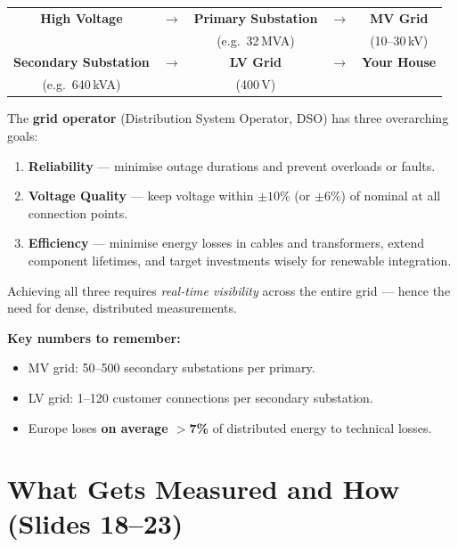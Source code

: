 \begin{center}
\begin{tabular}{ccccc}
\toprule
\textbf{High Voltage} & $\rightarrow$ &
\textbf{Primary Substation} & $\rightarrow$ &
\textbf{MV Grid} \\
& & (e.g.\ 32\,MVA) & & (10--30\,kV) \\
\midrule
\textbf{Secondary Substation} & $\rightarrow$ &
\textbf{LV Grid} & $\rightarrow$ &
\textbf{Your House} \\
(e.g.\ 640\,kVA) & & (400\,V) & & \\
\bottomrule
\end{tabular}
\end{center}
 
\vspace{0.5em}
The \textbf{grid operator} (Distribution System Operator, DSO) has
three overarching goals:
 
\begin{enumerate}[leftmargin=2em, itemsep=4pt]
  \item \textbf{Reliability} --- minimise outage durations and
        prevent overloads or faults.
  \item \textbf{Voltage Quality} --- keep voltage within
        $\pm10\%$ (or $\pm6\%$) of nominal at all connection points.
  \item \textbf{Efficiency} --- minimise energy losses in cables
        and transformers, extend component lifetimes, and target
        investments wisely for renewable integration.
\end{enumerate}
 
Achieving all three requires \emph{real-time visibility} across
the entire grid --- hence the need for dense, distributed
measurements.
 
\begin{notebox}
\textbf{Key numbers to remember:}
\begin{itemize}[itemsep=2pt]
  \item MV grid: 50--500 secondary substations per primary.
  \item LV grid: 1--120 customer connections per secondary
        substation.
  \item Europe loses \textbf{on average $>$7\%} of distributed
        energy to technical losses.
\end{itemize}
\end{notebox}
 
\clearpage
\section{What Gets Measured and How (Slides 18--23)}
 
